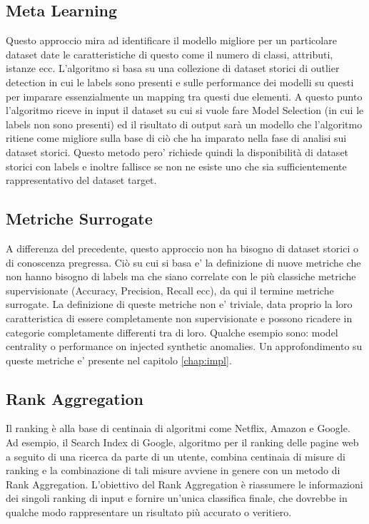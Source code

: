 \subsection{Meta Learning}
Questo approccio mira ad identificare il modello migliore per un particolare dataset date le caratteristiche di questo come il numero di classi, attributi, istanze ecc. L'algoritmo si basa su una collezione di dataset storici di outlier detection in cui le labels sono presenti e sulle performance dei modelli su questi per imparare essenzialmente un mapping tra questi due elementi. 
A questo punto l'algoritmo riceve in input il dataset su cui si vuole fare Model Selection (in cui le labels non sono presenti) ed il risultato di output sarà un modello che l'algoritmo ritiene come migliore sulla base di ciò che ha imparato nella fase di analisi sui dataset storici.
Questo metodo pero' richiede quindi la disponibilità di dataset storici con labels e inoltre fallisce se non ne esiste uno che sia sufficientemente rappresentativo del dataset target.
\subsection{Metriche Surrogate}
A differenza del precedente, questo approccio non ha bisogno di dataset storici o di conoscenza pregressa. Ciò su cui si basa e' la definizione di nuove metriche che non hanno bisogno di labels ma che siano correlate con le più classiche metriche supervisionate (Accuracy, Precision, Recall ecc), da qui il termine metriche surrogate.
La definizione di queste metriche non e' triviale, data proprio la loro caratteristica di essere completamente non supervisionate e possono ricadere in categorie completamente differenti tra di loro. Qualche esempio sono: model centrality o performance on injected synthetic anomalies. Un approfondimento su queste metriche e' presente nel capitolo \ref{chap:impl}.


\subsection{Rank Aggregation}
Il ranking è alla base di centinaia di algoritmi come Netflix, Amazon e Google. 
Ad esempio, il Search Index di Google, algoritmo per il ranking delle pagine web a seguito di una ricerca da parte di un utente, combina centinaia di misure di ranking e la combinazione di tali misure avviene in genere con un metodo di Rank Aggregation. 
L'obiettivo del Rank Aggregation è riassumere le informazioni dei singoli ranking di input e fornire un'unica classifica finale, che dovrebbe in qualche modo rappresentare un risultato più accurato o veritiero. 

